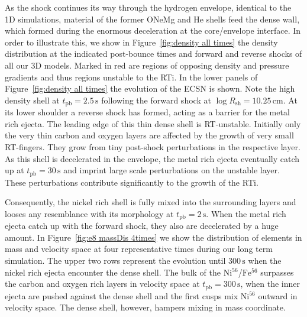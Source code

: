 \documentclass[fleqn,usenatbib]{mnras}
\newcommand{\tpb}{\ensuremath{t_{\text{pb}}}}
\newcommand{\nickel}{$\mathrm{Ni^{56}}$\xspace}
\newcommand{\iron}{$\mathrm{Fe^{56}}$\xspace}
\renewcommand{\sec}{\xspace\ensuremath{\text{s}}}
\begin{document}
As the shock continues its way through the hydrogen envelope, identical to the 1D simulations, material of the former ONeMg and He shells feed the dense wall, which formed during the enormous deceleration at the core/envelope interface. In order to illustrate this, we show in Figure~\ref{fig:density all times} the density distribution at the indicated post-bounce times and forward and reverse shocks of all our 3D models. Marked in red are regions of opposing density and pressure gradients and thus regions unstable to the RTi.
In the lower panels of Figure~\ref{fig:density all times} the evolution of the ECSN is shown. Note the high density shell at $\tpb=2.5\,\sec$ following the forward shock at $\log{R_{\mathrm{sh}}}=10.25\,\mathrm{cm}$. 
At its lower shoulder a reverse shock has formed, acting as a barrier for the metal rich ejecta. The leading edge of this thin dense shell is RT-unstable. Initially only the very thin carbon and oxygen layers are affected by the growth of very small RT-fingers. They grow from tiny post-shock perturbations in the respective layer. As this shell is decelerated in the envelope, the metal rich ejecta eventually catch up at $\tpb=30\,\sec$ and imprint large scale perturbations on the unstable layer. These perturbations contribute significantly to the growth of the RTi.

Consequently, the nickel rich shell is fully mixed into the surrounding layers and looses any resemblance with its morphology at $\tpb=2\,\sec$. 
When the metal rich ejecta catch up with the forward shock, they also are decelerated by a huge amount.
In Figure~\ref{fig:e8 massDis 4times} we show the distribution of elements in mass and velocity space at four representative times during our long term simulation. The upper two rows represent the evolution until $300\,\text{s}$ when the nickel rich ejecta encounter the dense shell.
The bulk of the \nickel/\iron surpasses the carbon and oxygen rich layers in velocity space at $t_{\mathrm{pb}}=300\,\text{s}$, when the inner ejecta are pushed against the dense shell and the first cusps mix \nickel outward in velocity space. The dense shell, however, hampers mixing in mass coordinate.
\end{document}
